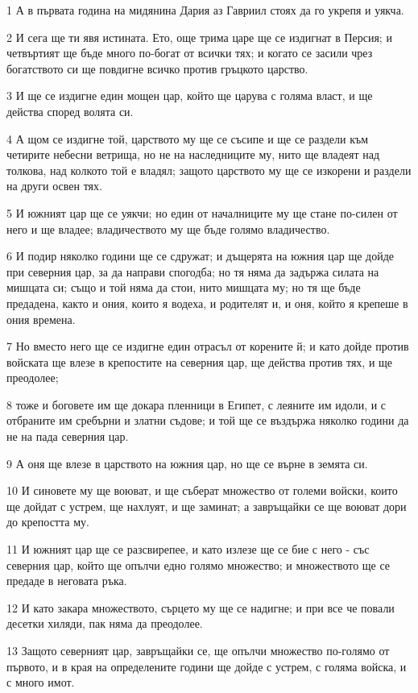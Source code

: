 \par 1 А в първата година на мидянина Дария аз Гавриил стоях да го укрепя и уякча.
\par 2 И сега ще ти явя истината. Ето, още трима царе ще се издигнат в Персия; и четвъртият ще бъде много по-богат от всички тях; и когато се засили чрез богатството си ще повдигне всичко против гръцкото царство.
\par 3 И ще се издигне един мощен цар, който ще царува с голяма власт, и ще действа според волята си.
\par 4 А щом се издигне той, царството му ще се съсипе и ще се раздели към четирите небесни ветрища, но не на наследниците му, нито ще владеят над толкова, над колкото той е владял; защото царството му ще се изкорени и раздели на други освен тях.
\par 5 И южният цар ще се уякчи; но един от началниците му ще стане по-силен от него и ще владее; владичеството му ще бъде голямо владичество.
\par 6 И подир няколко години ще се сдружат; и дъщерята на южния цар ще дойде при северния цар, за да направи спогодба; но тя няма да задържа силата на мишцата си; също и той няма да стои, нито мишцата му; но тя ще бъде предадена, както и ония, които я водеха, и родителят и, и оня, който я крепеше в ония времена.
\par 7 Но вместо него ще се издигне един отрасъл от корените й; и като дойде против войската ще влезе в крепостите на северния цар, ще действа против тях, и ще преодолее;
\par 8 тоже и боговете им ще докара пленници в Египет, с леяните им идоли, и с отбраните им сребърни и златни съдове; и той ще се въздържа няколко години да не на пада северния цар.
\par 9 А оня ще влезе в царството на южния цар, но ще се върне в земята си.
\par 10 И синовете му ще воюват, и ще съберат множество от големи войски, които ще дойдат с устрем, ще нахлуят, и ще заминат; а завръщайки се ще воюват дори до крепостта му.
\par 11 И южният цар ще се разсвирепее, и като излезе ще се бие с него - със северния цар, който ще опълчи едно голямо множество; и множеството ще се предаде в неговата ръка.
\par 12 И като закара множеството, сърцето му ще се надигне; и при все че повали десетки хиляди, пак няма да преодолее.
\par 13 Защото северният цар, завръщайки се, ще опълчи множество по-голямо от първото, и в края на определените години ще дойде с устрем, с голяма войска, и с много имот.
